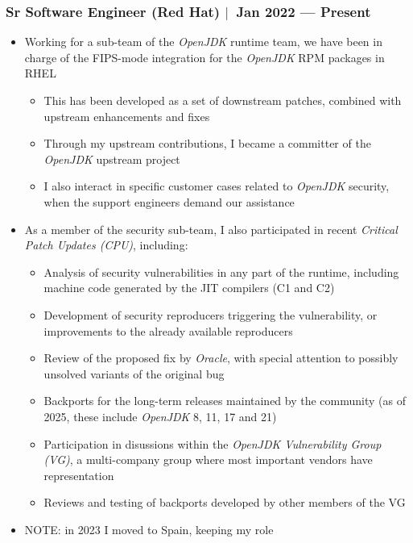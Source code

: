 \documentclass[12pt, a4paper]{article}
\newcommand{\mysep}{{\Large $\mid$}\ }
\begin{document}
    \subsubsection*{Sr Software Engineer (Red Hat) \mysep Jan 2022 --- Present}
    \begin{itemize}
        \item Working for a sub-team of the \emph{OpenJDK} runtime team,
        we have been in charge of the FIPS-mode integration
        for the \emph{OpenJDK} RPM packages in RHEL
        \begin{itemize}
            \item This has been developed as a set of downstream patches,
            combined with upstream enhancements and fixes
            \item Through my upstream contributions,
            I became a committer of the \emph{OpenJDK} upstream project
            \item I also interact in specific customer cases
            related to \emph{OpenJDK} security,
            when the support engineers demand our assistance
        \end{itemize}
        \item As a member of the security sub-team, I also participated in
        recent \emph{Critical Patch Updates (CPU)}, including:
        \begin{itemize}
            \item Analysis of security vulnerabilities in any part of the runtime,
            including machine code generated by the JIT compilers (C1 and C2)
            \item Development of security reproducers triggering the vulnerability,
            or improvements to the already available reproducers
            \item Review of the proposed fix by \emph{Oracle}, with special attention to
            possibly unsolved variants of the original bug
            \item Backports for the long-term releases maintained by the community
            (as of 2025, these include \emph{OpenJDK} 8, 11, 17 and 21)
            \item Participation in disussions within the \emph{OpenJDK Vulnerability Group (VG)},
            a multi-company group where most important vendors have representation
            \item Reviews and testing of backports developed by other members of the VG
        \end{itemize}
        \item NOTE: in 2023 I moved to Spain, keeping my role
    \end{itemize}
\end{document}
